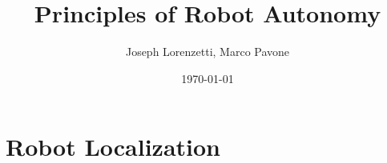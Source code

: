 \documentclass[nohyper,nobib]{tufte-book}
\title{Principles of Robot Autonomy}
\author{Joseph Lorenzetti, Marco Pavone}
\date{\today}
\begin{document}
\chapter{Robot Localization}


\printbibliography
\end{document}
